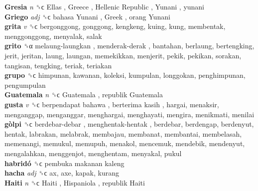 \textbf{Gresia} \emph{n}  ␝ϲ   Ellas ,  Greece ,  Hellenic Republic ,  Yunani , yunani  \\
\textbf{Griego} \emph{adj}  ␝ϲ   bahasa Yunani ,  Greek ,  orang Yunani   \\
\textbf{grita} \emph{v}  ␝ϲ  bergonggong, gonggong, kengkeng, kuing, kung, membentak, menggonggong, menyalak, salak  \\
\textbf{grito} ␝α   melaung-laungkan ,  menderak-derak , bantahan, berlaung, bertengking, jerit, jeritan, laung, laungan, memekikkan, menjerit, pekik, pekikan, sorakan, tangisan, tengking, teriak, teriakan  \\
\textbf{grupo} ␝ϲ  himpunan, kawanan, koleksi, kumpulan, longgokan, penghimpunan, pengumpulan  \\
\textbf{Guatemala} \emph{n}  ␝ϲ   Guatemala ,  republik Guatemala   \\
\textbf{gusta} \emph{v}  ␝ϲ   berpendapat bahawa ,  berterima kasih , hargai, menaksir, menganggap, menganggar, menghargai, menghayati, mengira, menikmati, menilai  \\
\textbf{gòlpi} ␝ϲ   berdebar-debar ,  menghentak-hentak , berdebar, berdengap, berdenyut, hentak, labrakan, melabrak, membajau, membanat, membantai, membelasah, memenangi, memukul, memupuh, menakol, mencemuk, mendebik, mendenyut, mengalahkan, menggenjot, menghentam, menyakal, pukul  \\
\textbf{habridó} ␝ϲ   pembuka makanan kaleng   \\
\textbf{hacha} \emph{adj}  ␝ϲ  ax, axe, kapak, kurang  \\
\textbf{Haiti} \emph{n}  ␝ϲ   Haiti ,  Hispaniola ,  republik Haiti   \\
